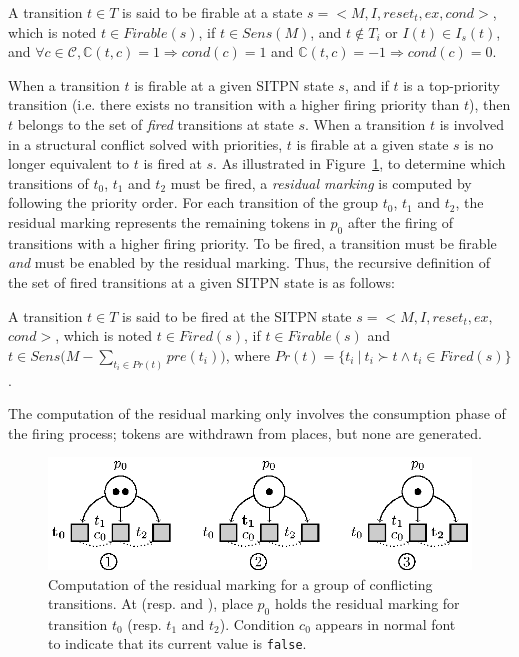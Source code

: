 \begin{definition}[Firability]
  \label{def:firable}
  A transition $t\in{}T$ is said to be firable at a state
  $s={<}M,I,reset_t,ex,cond{>}$, which is noted $t\in{}Firable(s)$, if
  $t\in{}Sens(M)$, and $t\notin{}T_i$ or $I(t)\in{}I_s(t)$, and
  $\forall c \in \mathcal{C}, \mathbb{C}(t, c) = 1 \Rightarrow cond(c)
  = 1$ and $\mathbb{C}(t, c) = -1 \Rightarrow cond(c) = 0$.
\end{definition}

When a transition $t$ is firable at a given SITPN state $s$, and if
$t$ is a top-priority transition (i.e. there exists no transition with
a higher firing priority than $t$), then $t$ belongs to the set of
\textit{fired} transitions at state $s$.  When a transition $t$ is
involved in a structural conflict solved with priorities, $t$ is
firable at a given state $s$ is no longer equivalent to $t$ is fired
at $s$.  As illustrated in Figure~\ref{fig:resid-marking}, to
determine which transitions of $t_0$, $t_1$ and $t_2$ must be fired, a
\emph{residual marking} is computed by following the priority
order. For each transition of the group $t_0$, $t_1$ and $t_2$, the
residual marking represents the remaining tokens in $p_0$ after the
firing of transitions with a higher firing priority. To be fired, a
transition must be firable \emph{and} must be enabled by the residual
marking. Thus, the recursive definition of the set of fired
transitions at a given SITPN state is as follows:

\begin{definition}[Fired]
  \label{def:fired}
  A transition $t\in{}T$ is said to be fired at the SITPN state
  $s={<}M,I,reset_t,ex,$ $cond{>}$, which is noted $t\in{}Fired(s)$,
  if $t\in{}Firable(s)$ and
  $t\in{}Sens\big(M-\sum\limits_{t_i\in{}Pr(t)}pre(t_i)\big)$, where
  $Pr(t)=\{t_i~|~t_i\succ{}t\wedge{}t_i\in{}Fired(s)\}$.
\end{definition}

The computation of the residual marking only involves the consumption
phase of the firing process; tokens are withdrawn from places, but
none are generated.

\begin{figure}[H]
  \centering
  \includegraphics[keepaspectratio=true, width=.9\textwidth]{resid-marking.eps}
  \caption[Computation of the residual marking of a group of
  conflicting transitions.]{Computation of the residual marking for a
    group of conflicting transitions. At 
    (resp.  and ), place $p_0$ holds the
    residual marking for transition $t_0$ (resp. $t_1$ and
    $t_2$). Condition $c_0$ appears in normal font to indicate that
    its current value is \texttt{false}.}
  \label{fig:resid-marking}
\end{figure}

